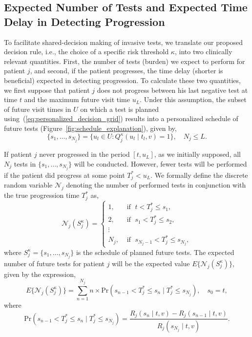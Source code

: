 \subsection{Expected Number of Tests and Expected Time Delay in Detecting Progression}
\label{subsec:exp_delay_estimation}
To facilitate shared-decision making of invasive tests, we translate our proposed decision rule, i.e., the choice of a specific risk threshold $\kappa$, into two clinically relevant quantities. First, the number of tests (burden) we expect to perform for patient $j$, and second, if the patient progresses, the time delay (shorter is beneficial) expected in detecting progression. To calculate these two quantities, we first suppose that patient $j$ does not progress between his last negative test at time $t$ and the maximum future visit time $u_L$. Under this assumption, the subset of future visit times in $U$ on which a test is planned using~(\ref{eq:personalized_decision_grid}) results into a personalized schedule of future tests (Figure~\ref{fig:schedule_explanation}), given by,
\begin{equation}
\label{eq:personalized_schedule_grid}
\{s_1, \ldots, s_{N_j}\} = \big\{ u_l \in U : Q_j^\kappa(u_l \mid t_l, v) = 1 \big\}, \quad N_j \leq L.
\end{equation}

If patient $j$ never progressed in the period $[t, u_L]$, as we initially supposed, all $N_j$ tests in $\{s_1, \ldots, s_{N_j}\}$ will be conducted. However, fewer tests will be performed if the patient did progress at some point $T_j^* < u_L$. We formally define the discrete random variable $\mathcal{N}_j$ denoting the number of performed tests in conjunction with the true progression time $T_j^*$ as,
\[
\mathcal{N}_j (S^\kappa_j) = \left \{
\begin{array}{ll}
1, & \mbox{ if } \; t < T^*_j \leq s_1,\\
2, & \mbox{ if } \; s_1 < T^*_j \leq s_2,\\
\vdots&\\
N_j, & \mbox{ if } \; s_{N_j-1} < T^*_j \leq s_{N_j},
\end{array}
\right.
\]
where $S^\kappa_j = \{s_1, \ldots, s_{N_j}\}$ is the schedule of planned future tests. The expected number of future tests for patient $j$ will be the expected value $E \big \{\mathcal N_j(S^\kappa_j)\big\}$, given by the expression,
\begin{equation*}
\label{eq:exp_tests}
E \big \{\mathcal N_j(S^\kappa_j)\big\} = \sum_{n = 1}^{N_j} n \times \mbox{Pr}(s_{n-1} < T^*_j \leq s_n \mid T^*_j \leq s_{N_j}), \quad s_0 = t,
\end{equation*}
where 
\begin{equation*}
\mbox{Pr}(s_{n-1} < T^*_j \leq s_n \mid T^*_j \leq s_{N_j}) = \frac{R_j(s_n \mid t, v) - R_j(s_{n-1} \mid t, v)}{R_j(s_{N_j} \mid t, v)}.
\end{equation*}

